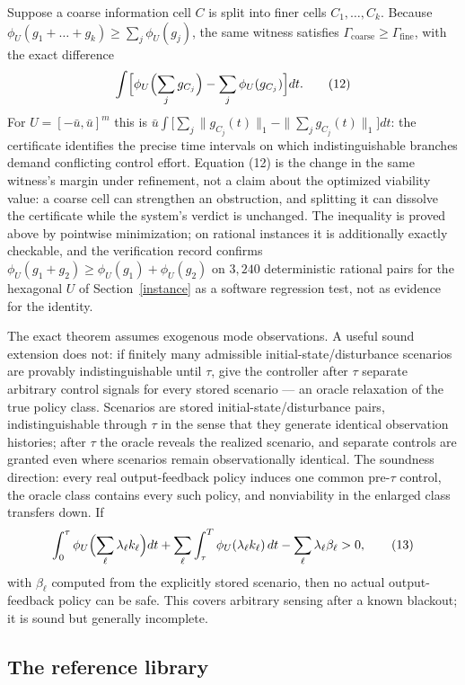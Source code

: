 \documentclass[10pt,twocolumn]{article}
\theoremstyle{plain}
\theoremstyle{definition}
\theoremstyle{remark}
\begin{document}
Suppose a coarse information cell \(C\) is split into finer cells
\(C_1,\dots,C_k\). Because
\(\phi_U(g_1 + \dots + g_k) \ge \sum_j \phi_U(g_j)\), the same witness
satisfies \(\Gamma_{\mathrm{coarse}} \ge \Gamma_{\mathrm{fine}}\), with the
exact difference
\[
\int \Bigl[ \phi_U\Bigl(\sum_j g_{C_j}\Bigr) - \sum_j \phi_U(g_{C_j}) \Bigr]
dt.
\tag{12}
\]
For \(U = [-\bar u, \bar u]^m\) this is
\(\bar u \int \bigl[\sum_j \|g_{C_j}(t)\|_1 - \|\sum_j g_{C_j}(t)\|_1\bigr] dt\):
the certificate identifies the precise time intervals on which
indistinguishable branches demand conflicting control effort. Equation (12)
is the change in the same witness's margin under refinement, not a claim
about the optimized viability value: a coarse cell can strengthen an
obstruction, and splitting it can dissolve the certificate while the
system's verdict is unchanged. The inequality is proved above by pointwise minimization; on rational
instances it is additionally exactly checkable, and the verification record
confirms \(\phi_U(g_1 + g_2) \ge \phi_U(g_1) + \phi_U(g_2)\) on
\(3{,}240\) deterministic rational pairs for the hexagonal \(U\) of
Section~\ref{instance} as a software regression test, not as evidence for
the identity.

The exact theorem assumes exogenous mode observations. A useful sound
extension does not: if finitely many admissible initial-state/disturbance
scenarios are provably indistinguishable until \(\tau\), give the controller
after \(\tau\) separate arbitrary control signals for every stored scenario
--- an oracle relaxation of the true policy class. Scenarios are stored
initial-state/disturbance pairs, indistinguishable through \(\tau\) in
the sense that they generate identical observation histories; after
\(\tau\) the oracle reveals the realized scenario, and separate controls
are granted even where scenarios remain observationally identical. The
soundness direction: every real output-feedback policy induces one common
pre-\(\tau\) control, the oracle class contains every such policy, and
nonviability in the enlarged class transfers down. If
\[
\int_0^\tau \phi_U\Bigl(\sum_\ell \lambda_\ell k_\ell\Bigr) dt
+ \sum_\ell \int_\tau^T \phi_U(\lambda_\ell k_\ell)\, dt
- \sum_\ell \lambda_\ell \beta_\ell > 0,
\tag{13}
\]
with \(\beta_\ell\) computed from the explicitly stored scenario, then no
actual output-feedback policy can be safe. This covers arbitrary sensing
after a known blackout; it is sound but generally incomplete.

\subsection{The reference library}\label{library}
\end{document}
